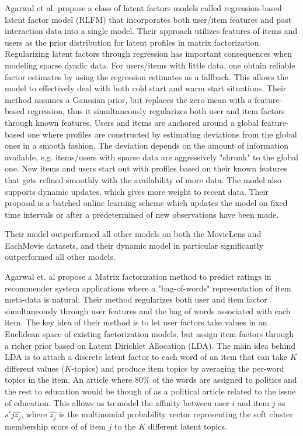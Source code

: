 Agarwal et al. \cite{Agarwal2009} propose a class of latent factors models
called regression-based latent factor model (RLFM) that incorporates both
user/item features and past interaction data into a single model. Their
approach utilizes features of items and users as the prior distribution for
latent profiles in matrix factorization. Regularizing latent factors through
regression has important consequences when modeling sparse dyadic data. For
users/items with little data, one obtain reliable factor estimates by using the
regression estimates as a fallback. This allows the model to effectively deal
with both cold start and warm start situations. Their method assumes a Gaussian
prior, but replaces the zero mean with a feature-based regression, thus it
simultaneously regularizes both user and item factors through known features.
Users and items are anchored around a global feature-based one where profiles
are constructed by estimating deviations from the global ones in a smooth
fashion. The deviation depends on the amount of information available, e.g.
items/users with sparse data are aggressively "shrunk" to the global one. New
items and users start out with profiles based on their known features that gets
refined smoothly with the availability of more data. The model also supports
dynamic updates, which gives more weight to recent data. Their proposal is a
batched online learning scheme which updates the model on fixed time intervals
or after a predetermined of new observations have been made.

Their model outperformed all other models on both the MovieLens and EachMovie
datasets, and their dynamic model in particular significantly outperformed all
other models.


Agarwal et. al \cite{Agarwal2010} propose a Matrix factorization method to
predict ratings in recommender system applications where a "bag-of-words"
representation of item meta-data is natural. Their method regularizes both user
and item factor simultaneously through user features and the bag of words
associated with each item. The key idea of their method is to let user factors
take values in an Euclidean space of existing factorization models, but assign
item factors through a richer prior based on Latent Dirichlet Allocation (LDA).
The main idea behind LDA is to attach a discrete latent factor to each word of
an item that can take $K$ different values ($K$-topics) and produce item topics
by averaging the per-word topics in the item. An article where 80$\%$ of the
words are assigned to politics and the rest to education would be though of as
a political article related to the issue of education. This allows us to model
the affinity between user $i$ and item $j$ as $s'{j}\hat{z_{j}}$, where
$\hat{z_{j}}$ is the multinomial probability vector representing the soft
cluster membership score of of item $j$ to the $K$ different latent topics.

